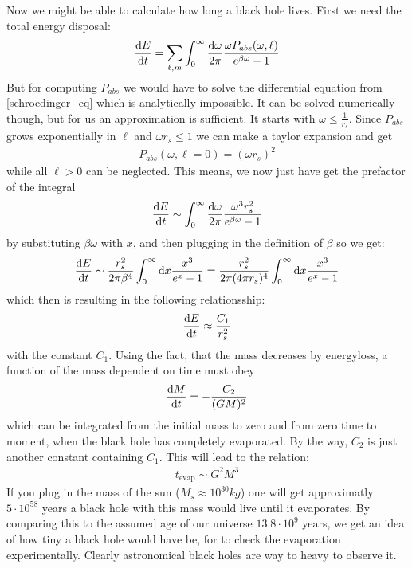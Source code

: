 	Now we might be able to calculate how long a black hole lives.
	First we need the total energy disposal:
	\begin{align}
		\frac{\mathrm{d} E}{\mathrm{d} t} =
		\sum_{\ell, m} \int_{0}^{\infty} \frac{\mathrm{d} \omega}{2 \pi}
		\frac{\omega P_{abs}(\omega,\ell)}{e^{\beta \omega} - 1}
	\end{align}
	But for computing $P_{abs}$ we would have to solve the differential equation from \eqref{schroedinger_eq} which is analytically impossible. It can be solved numerically though, but for us an approximation is sufficient. It starts with $\omega \leq \frac{1}{r_s}$. Since $P_{abs}$ grows exponentially in $\ell$ and $\omega r_s \leq 1$ we can make a taylor expansion and get
	\begin{align}
		P_ {abs}(\omega, \ell=0) = (\omega r_s)^2
	\end{align} 
	while all $\ell > 0$ can be neglected.
	This means, we now just have get the prefactor of the integral
	\begin{align}
		\frac{\mathrm{d} E}{\mathrm{d} t} \sim \int_{0}^{\infty} \frac{\mathrm{d} \omega}{2\pi} \frac{\omega^3 r_s^2}{e^{\beta \omega}-1}
	\end{align}
	by substituting $\beta \omega$ with $x$, and then plugging in the definition of $\beta$ so we get:
	\begin{align}
		\frac{\mathrm{d} E}{\mathrm{d} t} \sim \frac{r_s^2}{2 \pi \beta^4} \int_{0}^{\infty} \mathrm{d} x \frac{x^3}{e^{x}-1}
		= \frac{r_s^2}{2 \pi (4 \pi r_s)^4} \int_{0}^{\infty} \mathrm{d} x \frac{x^3}{e^{x}-1}
	\end{align}
	which then is resulting in the following relationsship:
	\begin{align}
		\frac{\mathrm{d} E}{\mathrm{d} t} \approx \frac{C_1}{r_s^2}
	\end{align}	
	with the constant $C_1$. Using the fact, that the mass decreases by energyloss, a function of the mass dependent on time must obey
	\begin{align}
		\frac{\mathrm{d} M}{\mathrm{d} t} = -\frac{C_2}{(GM)^2} 
	\end{align}		
	which can be integrated from the initial mass to zero and from zero time to moment, when the black hole has completely evaporated. By the way, $C_2$ is just another constant containing $C_1$. This will lead to the relation:
	\begin{align}
		t_{\text{evap}} \sim G^2 M^3
	\end{align}
	If you plug in the mass of the sun ($M_s \approx 10^{30} \unit{kg}$) one will get approximatly $5 \cdot 10^{58}$ years a black hole with this mass would live until it evaporates. By comparing this to the assumed age of our universe $13.8 \cdot 10^{9}$ years, we get an idea of how tiny a black hole would have be, for to check the evaporation experimentally. Clearly astronomical black holes are way to heavy to observe it.
	

